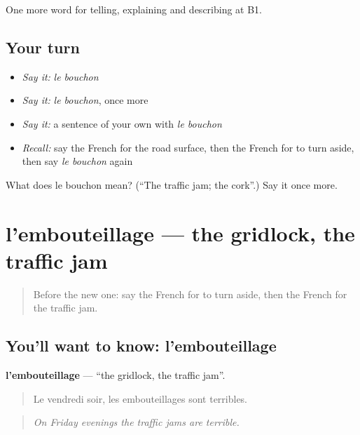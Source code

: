 \begin{grammarlens}[title={What you've built}]
One more word for telling, explaining and describing at B1.
\end{grammarlens}

\subsection*{Your turn}
\begin{itemize}
\raggedright
  \item \emph{Say it:} \emph{le bouchon}
  \item \emph{Say it:} \emph{le bouchon}, once more
  \item \emph{Say it:} a sentence of your own with \emph{le bouchon}
  \item \emph{Recall:} say the French for the road surface, then the French for to turn aside, then say \emph{le bouchon} again
\end{itemize}

\begin{tcolorbox}[breakable,colback=teal!4,colframe=teal!35!black,title={Before you move on}]
What does le bouchon mean? (\textquotedblleft{}The traffic jam; the cork\textquotedblright{}.) Say it once more.
\end{tcolorbox}
\section[l'embouteillage]{l'embouteillage — the gridlock, the traffic jam}

\label{lesson:FR-C410-embouteillage}



\begin{quote}
Before the new one: say the French for to turn aside, then the French for the traffic jam.
\end{quote}

\subsection*{You'll want to know: l'embouteillage}
\textbf{l'embouteillage} — \textquotedblleft{}the gridlock, the traffic jam\textquotedblright{}.

\begin{quote}
Le vendredi soir, les embouteillages sont terribles.
\end{quote}

\begin{quote}
\emph{On Friday evenings the traffic jams are terrible.}
\end{quote}

